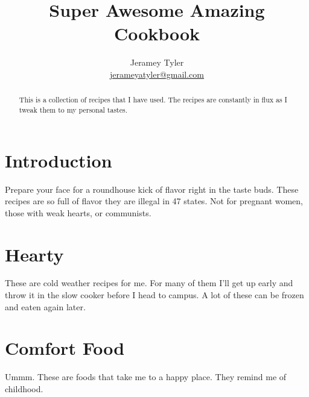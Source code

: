 \documentclass[%
a4paper,
10pt
]{article}
\begin{document}
\title{Super Awesome Amazing Cookbook}
\author{Jeramey Tyler\\ \href{mailto:jerameyatyler@gmail.com}{jerameyatyler@gmail.com}}
\maketitle

\begin{abstract}
    \noindent This is a collection of recipes that I have used. The recipes are constantly in flux as I tweak them to my personal tastes. 
\end{abstract}

\tableofcontents

\vspace{5em}

\section{Introduction}
Prepare your face for a roundhouse kick of flavor right in the taste buds. These recipes are so full of flavor they are illegal in 47 states. Not for pregnant women, those with weak hearts, or communists.

\section{Hearty}
These are cold weather recipes for me. For many of them I'll get up early and throw it in the slow cooker before I head to campus. A lot of these can be frozen and eaten again later. 






\section{Comfort Food}
Ummm. These are foods that take me to a happy place. They remind me of childhood.



\end{document}
